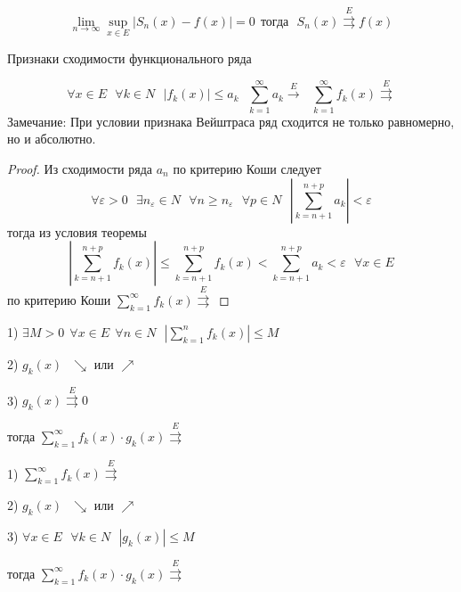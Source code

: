 \begin{block}
  $$
  \lim_{n \to \infty} \sup\limits_{x \in E} |S_n(x) - f(x)| = 0 ~~ \text{тогда}
  ~~~ S_n(x) \stackrel{E}{\rightrightarrows} f(x)
  $$
\end{block}

\begin{title}[\Large]
  Признаки сходимости функционального ряда
\end{title}

\begin{block}
  $$
  \forall x \in E ~~~ \forall k \in N ~~~ |f_k(x)| \le a_k ~~~
  \sum_{k=1}^{\infty}a_k \stackrel{E}{\rightarrow} ~~~
  \sum_{k=1}^{\infty} f_k (x) \stackrel{E}{\rightrightarrows}
  $$
  Замечание: При условии признака Вейштраса ряд сходится не только равномерно,
  но и абсолютно.
\end{block}

\begin{proof}
  Из сходимости ряда $a_n$ по критерию Коши следует
  $$
  \forall \varepsilon > 0 ~~~ \exists n_{\varepsilon} \in N ~~~ \forall n \ge
  n_{\varepsilon} ~~~ \forall p \in N ~~~ |\sum_{k=n+1}^{n+p} a_k| <
  \varepsilon
  $$
  тогда из условия теоремы
  $$
  \left| \sum_{k = n + 1}^{n+p} f_k(x) \right| \le
  \sum_{k = n + 1}^{n+p} f_k(x) < \sum_{k = n+1}^{n+p} a_k < \varepsilon ~~~
  \forall x \in E
  $$
  по критерию Коши $\sum_{k=1}^{\infty} f_k(x) \stackrel{E}{\rightrightarrows}$
\end{proof}

\begin{block}
  1)
  $
  \exists M > 0 ~~ \forall x \in E ~~ \forall n \in N ~~~
  \left| \sum_{k=1}^n f_k(x) \right| \le M
  $

  2) $g_k(x) ~~~ \searrow$ или $\nearrow$

  3) $g_k(x) \stackrel{E}{\rightrightarrows} 0$

  тогда $\sum_{k=1}^{\infty} f_k(x) \cdot g_k(x)\stackrel{E}{\rightrightarrows}$
\end{block}


\begin{block}
  1) $\sum_{k=1}^{\infty} f_k(x) \stackrel{E}{\rightrightarrows}$

  2) $g_k(x) ~~~ \searrow$ или $\nearrow$

  3) $\forall x \in E ~~~ \forall k \in N ~~~ |g_k(x)| \le M$

  тогда $\sum_{k=1}^{\infty} f_k(x) \cdot g_k(x)\stackrel{E}{\rightrightarrows}$
\end{block}

